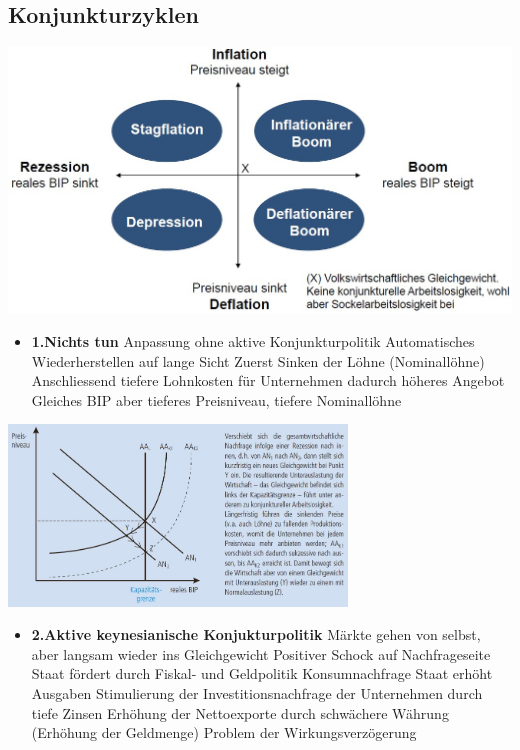 \subsection{Konjunkturzyklen}
	\includegraphics[width=15cm]{images/konjukturzyklen.jpg}\\
\begin{minipage}{10cm}
	\begin{itemize}
		\item \textbf{1.Nichts tun} 
		\subitem Anpassung ohne aktive Konjunkturpolitik
		\subitem Automatisches Wiederherstellen auf lange Sicht
		\subitem Zuerst Sinken der Löhne (Nominallöhne)
		\subitem Anschliessend tiefere Lohnkosten für Unternehmen dadurch höheres Angebot
		\subitem Gleiches BIP aber tieferes Preisniveau, tiefere Nominallöhne	
	\end{itemize}
\end{minipage}
\begin{minipage}{9cm}
	\includegraphics[width=9cm]{images/nichts.jpg}
\end{minipage}
\begin{minipage}{10cm}
	\begin{itemize}
		\item \textbf{2.Aktive keynesianische Konjukturpolitik}
		\subitem Märkte gehen von selbst, aber langsam wieder ins Gleichgewicht
		\subitem Positiver Schock auf Nachfrageseite
		\subitem Staat fördert durch Fiskal- und Geldpolitik Konsumnachfrage
		\subitem Staat erhöht Ausgaben
		\subitem Stimulierung der Investitionsnachfrage der Unternehmen durch tiefe Zinsen
		\subitem Erhöhung der Nettoexporte durch schwächere Währung (Erhöhung der Geldmenge)
		\subitem Problem der Wirkungsverzögerung
	\end{itemize}
\end{minipage}

